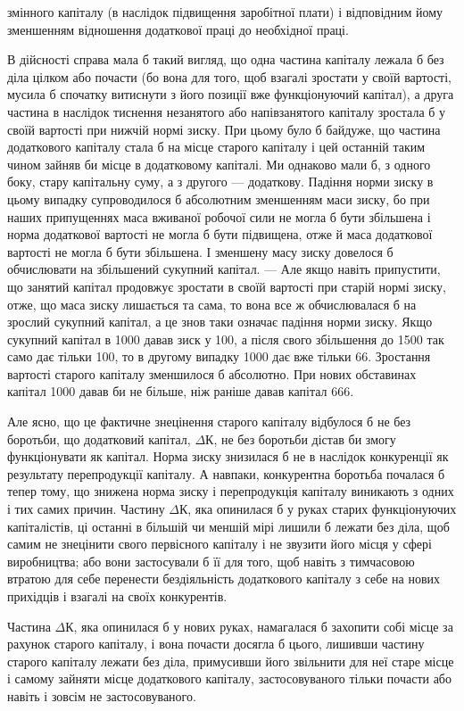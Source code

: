 \parcont{}  %
змінного капіталу (в наслідок підвищення заробітної плати) і відповідним
йому зменшенням відношення додаткової праці до
необхідної праці.

В дійсності справа мала б такий вигляд, що одна частина капіталу
лежала б без діла цілком або почасти (бо вона для того, щоб
взагалі зростати у своїй вартості, мусила б спочатку витиснути з
його позиції вже функціонуючий капітал), а друга частина в наслідок
тиснення незанятого або напівзанятого капіталу зростала б
у своїй вартості при нижчій нормі зиску. При цьому було б байдуже,
що частина додаткового капіталу стала б на місце старого капіталу
і цей останній таким чином зайняв би місце в додатковому
капіталі. Ми однаково мали б, з одного боку, стару капітальну
суму, а з другого — додаткову. Падіння норми зиску в цьому
випадку супроводилося б абсолютним зменшенням маси зиску, бо
при наших припущеннях маса вживаної робочої сили не могла б
бути збільшена і норма додаткової вартості не могла б бути підвищена,
отже й маса додаткової вартості не могла б бути збільшена.
І зменшену масу зиску довелося б обчислювати на збільшений
сукупний капітал. — Але якщо навіть припустити, що занятий
капітал продовжує зростати в своїй вартості при старій нормі
зиску, отже, що маса зиску лишається та сама, то вона все ж
обчислювалася б на зрослий сукупний капітал, а це знов таки
означає падіння норми зиску. Якщо сукупний капітал в 1000 давав
зиск у 100, а після свого збільшення до 1500 так само дає
тільки 100, то в другому випадку 1000 дає вже тільки 66. Зростання
вартості старого капіталу зменшилося б абсолютно. При
нових обставинах капітал \deq{} 1000 давав би не більше, ніж раніше
давав капітал \deq{} 666.

Але ясно, що це фактичне знецінення старого капіталу
відбулося б не без боротьби, що додатковий капітал, $ΔК$, не без
боротьби дістав би змогу функціонувати як капітал. Норма зиску
знизилася б не в наслідок конкуренції як результату перепродукції
капіталу. А навпаки, конкурентна боротьба почалася б тепер
тому, що знижена норма зиску і перепродукція капіталу виникають
з одних і тих самих причин. Частину $ΔК$, яка опинилася б
у руках старих функціонуючих капіталістів, ці останні в більшій
чи меншій мірі лишили б лежати без діла, щоб самим не знецінити
свого первісного капіталу і не звузити його місця у
сфері виробництва; або вони застосували б її для того, щоб навіть
з тимчасовою втратою для себе перенести бездіяльність
додаткового капіталу з себе на нових прихідців і взагалі на
своїх конкурентів.

Частина $ΔК$, яка опинилася б у нових руках, намагалася б
захопити собі місце за рахунок старого капіталу, і вона почасти
досягла б цього, лишивши частину старого капіталу лежати
без діла, примусивши його звільнити для неї старе місце і самому
зайняти місце додаткового капіталу, застосовуваного тільки
почасти або навіть і зовсім не застосовуваного.
